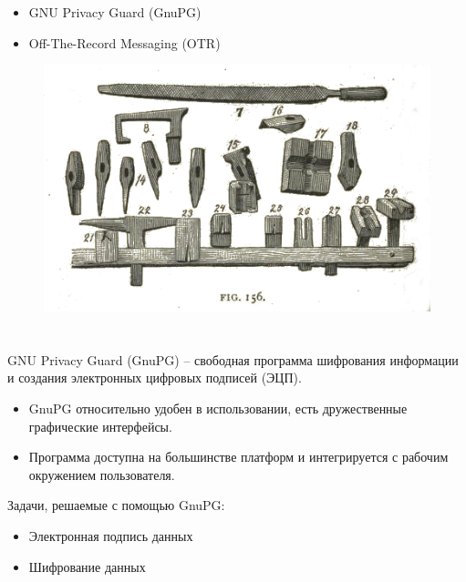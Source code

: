 \documentclass[presentation]{beamer}
\newcommand{\RaisedRightHand}{%
  \raisebox{-.50em}{\Large\HandRight}
}
\begin{document}


\section{}

\begin{frame}{}
  \begin{itemize}
  \item GNU Privacy Guard (GnuPG)
  \item Off-The-Record Messaging (OTR)
  \end{itemize}
  \begin{figure}[htb]
    \centering
    \includegraphics[height=0.6\textheight]{hammer-02.png}
  \end{figure}
\end{frame}



\section{}

\begin{frame}{}
  \RaisedRightHand GNU Privacy Guard
  (GnuPG) -- свободная программа шифрования информации и создания
  электронных цифровых подписей (ЭЦП).

  \begin{itemize}
  \item GnuPG относительно удобен в использовании, есть дружественные
    графические интерфейсы.
  \item Программа доступна на большинстве платформ и интегрируется с
    рабочим окружением пользователя.
  \end{itemize}

  Задачи, решаемые с помощью GnuPG:
  \begin{itemize}
  \item Электронная подпись данных
  \item Шифрование данных
  \end{itemize}
\end{frame}
\end{document}
